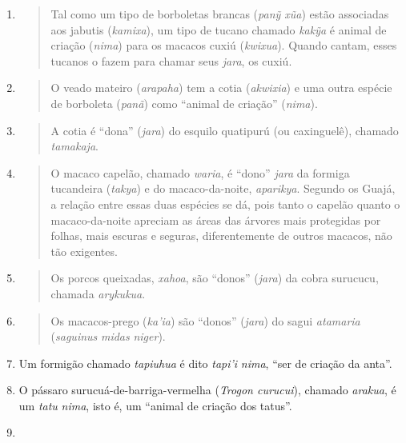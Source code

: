 \begin{enumerate}
\def\labelenumi{\arabic{enumi}.}
\item
  \begin{quote}
  Tal como um tipo de borboletas brancas (\emph{panỹ xũa}) estão
  associadas aos jabutis (\emph{kamixa}), um tipo de tucano chamado
  \emph{kakỹa} é animal de criação (\emph{nima}) para os macacos cuxiú
  (\emph{kwixua}). Quando cantam, esses tucanos o fazem para chamar seus
  \emph{jara}, os cuxiú.
  \end{quote}
\item
  \begin{quote}
  O veado mateiro (\emph{arapaha}) tem a cotia (\emph{akwixia}) e uma
  outra espécie de borboleta (\emph{panã}) como ``animal de criação''
  (\emph{nima}).
  \end{quote}
\item
  \begin{quote}
  A cotia é ``dona'' (\emph{jara}) do esquilo quatipurú (ou caxinguelê),
  chamado \emph{tamakaja}.
  \end{quote}
\item
  \begin{quote}
  O macaco capelão, chamado \emph{waria}, é ``dono'' \emph{jara} da
  formiga tucandeira (\emph{takya}) e do macaco-da-noite,
  \emph{aparikya}. Segundo os Guajá, a relação entre essas duas espécies
  se dá, pois tanto o capelão quanto o macaco-da-noite apreciam as áreas
  das árvores mais protegidas por folhas, mais escuras e seguras,
  diferentemente de outros macacos, não tão exigentes.
  \end{quote}
\item
  \begin{quote}
  Os porcos queixadas, \emph{xahoa}, são ``donos'' (\emph{jara}) da
  cobra surucucu, chamada \emph{arykukua}.
  \end{quote}
\item
  \begin{quote}
  Os macacos-prego (\emph{ka'ia}) são ``donos'' (\emph{jara}) do sagui
  \emph{atamaria} (\emph{saguinus} \emph{midas} \emph{niger}).
  \end{quote}
\item
  Um formigão chamado \emph{tapiuhua} é dito \emph{tapi'i} \emph{nima},
  ``ser de criação da anta''.
\item
  O pássaro surucuá-de-barriga-vermelha (\emph{Trogon curucui}), chamado
  \emph{arakua}, é um \emph{tatu} \emph{nima}, isto é, um ``animal de
  criação dos tatus''.
\item

\end{enumerate}

